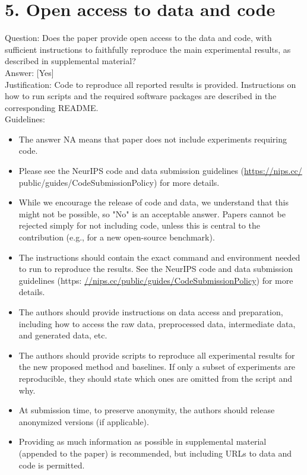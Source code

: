 \documentclass[10pt]{article}
\begin{document}
\section*{5. Open access to data and code}
Question: Does the paper provide open access to the data and code, with sufficient instructions to faithfully reproduce the main experimental results, as described in supplemental material?\\[0pt]
Answer: [Yes]\\
Justification: Code to reproduce all reported results is provided. Instructions on how to run scripts and the required software packages are described in the corresponding README.\\
Guidelines:

\begin{itemize}
  \item The answer NA means that paper does not include experiments requiring code.
  \item Please see the NeurIPS code and data submission guidelines (\href{https://nips.cc/}{https://nips.cc/} public/guides/CodeSubmissionPolicy) for more details.
  \item While we encourage the release of code and data, we understand that this might not be possible, so "No" is an acceptable answer. Papers cannot be rejected simply for not including code, unless this is central to the contribution (e.g., for a new open-source benchmark).
  \item The instructions should contain the exact command and environment needed to run to reproduce the results. See the NeurIPS code and data submission guidelines (https: \href{//nips.cc/public/guides/CodeSubmissionPolicy}{//nips.cc/public/guides/CodeSubmissionPolicy}) for more details.
  \item The authors should provide instructions on data access and preparation, including how to access the raw data, preprocessed data, intermediate data, and generated data, etc.
  \item The authors should provide scripts to reproduce all experimental results for the new proposed method and baselines. If only a subset of experiments are reproducible, they should state which ones are omitted from the script and why.
  \item At submission time, to preserve anonymity, the authors should release anonymized versions (if applicable).
  \item Providing as much information as possible in supplemental material (appended to the paper) is recommended, but including URLs to data and code is permitted.
\end{itemize}
\end{document}
